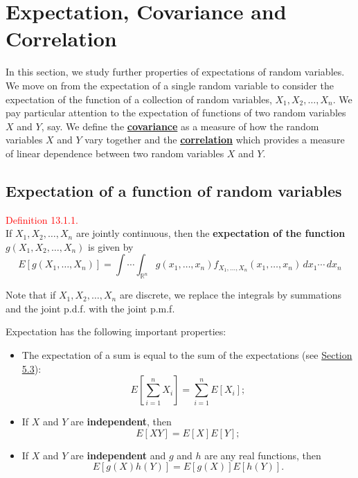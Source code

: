 \documentclass[
]{book}
\providecommand{\tightlist}{%
  \setlength{\itemsep}{0pt}\setlength{\parskip}{0pt}}
\begin{document}
\hypertarget{Correlation}{%
\chapter{Expectation, Covariance and Correlation}\label{Correlation}}

In this section, we study further properties of expectations of random variables. We move on from the expectation of a single random variable to consider the expectation of the function of a collection of random variables, \(X_1, X_2, \ldots, X_n\). We pay particular attention to the expectation of functions of two random variables \(X\) and \(Y\), say. We define the \protect\hyperlink{Correlation:Covariance}{\textbf{covariance}} as a measure of how the random variables \(X\) and \(Y\) vary together and the \protect\hyperlink{Correlation:Correlation}{\textbf{correlation}} which provides a measure of linear dependence between two random variables \(X\) and \(Y\).

\hypertarget{Correlation:Expectation}{%
\section{Expectation of a function of random variables}\label{Correlation:Expectation}}

\hypertarget{Correlation:def:expectation}{}
\textcolor{red}{Definition 13.1.1.}\\
If \(X_1,X_2,\dots,X_n\) are jointly continuous, then the \textbf{expectation of the function} \(g(X_1,X_2,\dots,X_n)\) is given by\\

\[ E[g(X_1,\dots,X_n)] = \int\cdots\int_{\mathbb{R}^n} g(x_1,\dots,x_n) f_{X_1,\dots,X_n}(x_1,\dots,x_n) \,dx_1 \cdots \,dx_n \]

Note that if \(X_1,X_2,\dots,X_n\) are discrete, we replace the integrals by summations and the joint p.d.f. with the joint p.m.f.

Expectation has the following important properties:

\begin{itemize}
\tightlist
\item
  The expectation of a sum is equal to the sum of the expectations (see \protect\hyperlink{rv:expect}{Section 5.3}):\\

  \[ E \left[ \sum\limits_{i=1}^{n} X_i \right] = \sum\limits_{i=1}^{n} E[X_i];\]
\item
  If \(X\) and \(Y\) are \textbf{independent}, then\\

  \[E[XY] = E[X]E[Y];\]
\item
  If \(X\) and \(Y\) are \textbf{independent} and \(g\) and \(h\) are any real functions, then\\

  \[E[g(X)h(Y)]=E[g(X)]E[h(Y)].\]
\end{itemize}
\end{document}
